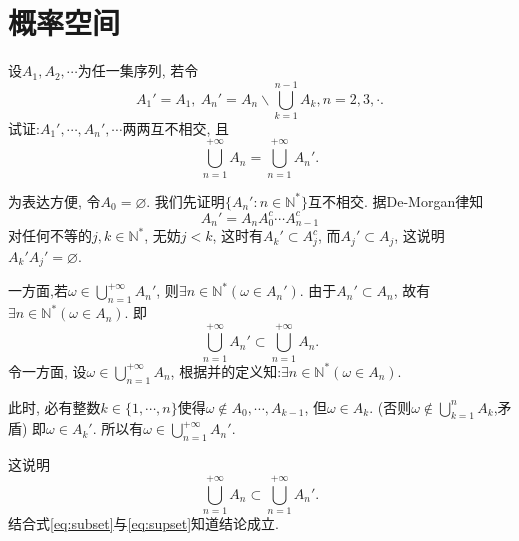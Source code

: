\setcounter{chapter}{0}
\chapter{概率空间}

\begin{yyEx}
	设$A_1,A_2,\cdots$为任一集序列, 若令
	\begin{equation}
	A_1' = A_1,~A_n' = A_n\backslash \bigcup_{k=1}^{n-1}A_k,n=2,3,\cdot.
	\end{equation}
	试证:$A_1',\cdots,A_n',\cdots$两两互不相交, 且
	\begin{equation}
	\bigcup_{n=1}^{+\infty}A_n = \bigcup_{n=1}^{+\infty}A_n'.
	\end{equation}
\end{yyEx}

\begin{yyProof}
	为表达方便, 令$A_0 = \varnothing$.
	我们先证明$\{A_n':n\in\mathbb{N}^*\}$互不相交. 据De-Morgan律知
	\begin{equation}
	A_n' = A_nA_0^c\cdots A_{n-1}^c
	\end{equation}
	对任何不等的$j,k\in\mathbb{N}^*$, 无妨$j<k$, 这时有$A_k'\subset A_j^c$, 而$A_j'\subset A_j$, 这说明$A_k'A_j' = \varnothing$.
	
	一方面,若$\omega\in \bigcup_{n=1}^{+\infty}A_n'$, 则$\exists n\in\mathbb{N}^*(\omega\in A_n').$
	由于$A_n'\subset A_n$, 故有$\exists n\in\mathbb{N}^*(\omega\in A_n).$
	即\begin{equation}\label{eq:subset}
	\bigcup_{n=1}^{+\infty}A_n' \subset \bigcup_{n=1}^{+\infty}A_n.
	\end{equation}
	令一方面, 设$\omega\in \bigcup_{n=1}^{+\infty}A_n$, 根据并的定义知:$\exists n\in\mathbb{N}^*(\omega\in A_n).$
	
	此时, 必有整数$k\in\{1,\cdots,n\}$使得$\omega\notin A_0,\cdots,A_{k-1}$, 但$\omega\in A_k$. (否则$\omega\notin \bigcup_{k=1}^nA_k$,矛盾)
	即$\omega\in A_k'$.
	所以有$\omega\in \bigcup_{n=1}^{+\infty}A_n'$.
	
	这说明\begin{equation}\label{eq:supset}
	\bigcup_{n=1}^{+\infty}A_n \subset \bigcup_{n=1}^{+\infty}A_n'.
	\end{equation}
	结合式\ref{eq:subset}与\ref{eq:supset}知道结论成立.
\end{yyProof}


